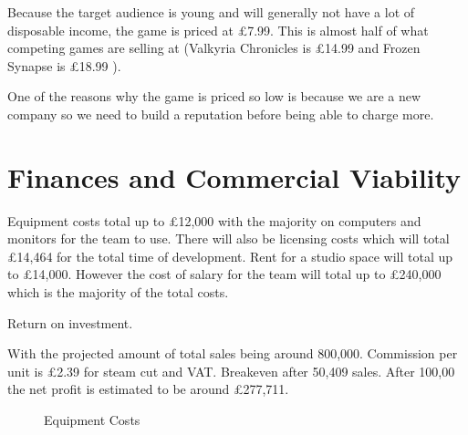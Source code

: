 \documentclass{scrartcl}
\begin{document}
Because the target audience is young and will generally not have a lot of disposable income, the game is priced at \pounds 7.99. 
This is almost half of what competing games are selling at (Valkyria Chronicles is \pounds 14.99 and Frozen Synapse is \pounds 18.99 \cite{Valkyria, Frozen}). 

One of the reasons why the game is priced so low is because we are a new company so we need to build a reputation before being able to charge more.


\section{Finances and Commercial Viability}
Equipment costs total up to \pounds 12,000 with the majority on computers and monitors for the team to use. 
There will also be licensing costs which will total \pounds 14,464 for the total time of development.
Rent for a studio space will total up to \pounds 14,000. 
However the cost of salary for the team will total up to \pounds 240,000 which is the majority of the total costs.


Return on investment.

With the projected amount of total sales being around 800,000.
Commission per unit is \pounds 2.39 for steam cut and VAT.
Breakeven after 50,409 sales.
After 100,00 the net profit is estimated to be around \pounds 277,711.




\begin{figure}[h]
	\caption{Equipment Costs}
\end{figure}
\end{document}
